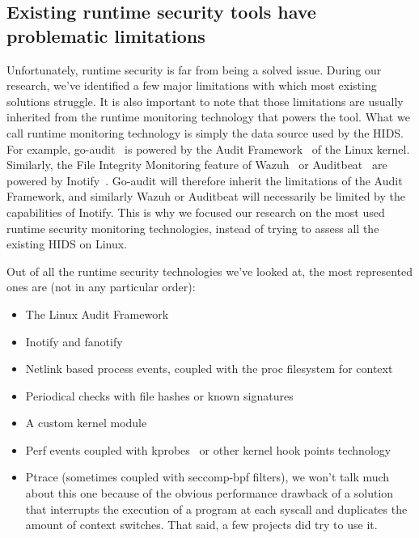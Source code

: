 \subsection{Existing runtime security tools have problematic limitations}

Unfortunately, runtime security is far from being a solved issue.
During our research, we’ve identified a few major limitations with which most existing solutions struggle.
It is also important to note that those limitations are usually inherited from the runtime monitoring technology that powers the tool.
What we call runtime monitoring technology is simply the data source used by the HIDS.
For example, go-audit~\cite{RuntimeSecurityMonitoringWithEBPF:GOAudit} is powered by the Audit Framework~\cite{RuntimeSecurityMonitoringWithEBPF:LinuxAudit} of the Linux kernel. Similarly, the File Integrity Monitoring feature of Wazuh~\cite{RuntimeSecurityMonitoringWithEBPF:Wazuh} or Auditbeat~\cite{RuntimeSecurityMonitoringWithEBPF:AuditBeat} are powered by Inotify~\cite{RuntimeSecurityMonitoringWithEBPF:FilesystemNotification}.
Go-audit will therefore inherit the limitations of the Audit Framework, and similarly Wazuh or Auditbeat will necessarily be limited by the capabilities of Inotify.
This is why we focused our research on the most used runtime security monitoring technologies, instead of trying to assess all the existing HIDS on Linux.

Out of all the runtime security technologies we’ve looked at, the most represented ones are (not in any particular order):

\begin{itemize}
  \item The Linux Audit Framework
  \item Inotify and fanotify~\cite{RuntimeSecurityMonitoringWithEBPF:Fanotify}
  \item Netlink based process events, coupled with the proc filesystem for context
  \item Periodical checks with file hashes or known signatures
  \item A custom kernel module
  \item Perf events coupled with kprobes~\cite{RuntimeSecurityMonitoringWithEBPF:KprobeDocumentation} or other kernel hook points technology
  \item Ptrace (sometimes coupled with seccomp-bpf filters), we won’t talk much about this one because of the obvious performance drawback of a solution that interrupts the execution of a program at each syscall and duplicates the amount of context switches.
  That said, a few projects did try to use it.
\end{itemize}

